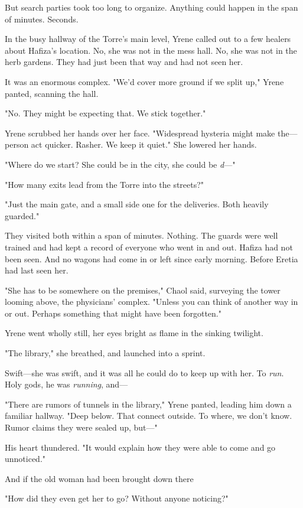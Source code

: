 But search parties took too long to organize.
Anything could happen in the span of minutes.
Seconds.

In the busy hallway of the Torre's main level, Yrene called out to a few healers about Hafiza's location.
No, she was not in the mess hall.
No, she was not in the herb gardens.
They had just been that way and had not seen her.

It was an enormous complex.
"We'd cover more ground if we split up," Yrene panted, scanning the hall.

"No.
They might be expecting that.
We stick together."

Yrene scrubbed her hands over her face.
"Widespread hysteria might make the---person act quicker.
Rasher.
We keep it quiet."
She lowered her hands.

"Where do we start?
She could be in the city, she could be \emph{d}---"

"How many exits lead from the Torre into the streets?"

"Just the main gate, and a small side one for the deliveries.
Both heavily guarded."

They visited both within a span of minutes.
Nothing.
The guards were well trained and had kept a record of everyone who went in and out.
Hafiza had not been seen.
And no wagons had come in or left since early morning.
Before Eretia had last seen her.

"She has to be somewhere on the premises," Chaol said, surveying the tower looming above, the physicians' complex.
"Unless you can think of another way in or out.
Perhaps something that might have been forgotten."

Yrene went wholly still, her eyes bright as flame in the sinking twilight.

"The library," she breathed, and launched into a sprint.

Swift---she was swift, and it was all he could do to keep up with her.
To \emph{run}.
Holy gods, he was \emph{running}, and---

"There are rumors of tunnels in the library," Yrene panted, leading him down a familiar hallway.
"Deep below.
That connect outside.
To where, we don't know.
Rumor claims they were sealed up, but---"

His heart thundered.
"It would explain how they were able to come and go unnoticed."

And if the old woman had been brought down there 

"How did they even get her to go?
Without anyone noticing?"

